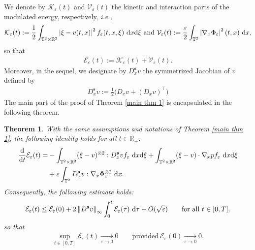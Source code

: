 \documentclass[11pt,reqno]{amsart}
\newtheorem{thm}{Theorem}[section]
\numberwithin{equation}{section}
\def\dd{{\rm d}}
\begin{document}
We denote by $\mathcal{K}_{\varepsilon}(t)$ and $\mathcal{V}_{\varepsilon}(t)$ the kinetic and interaction parts of the modulated energy, respectively, {\it i.e.,} 
\begin{align*}
\mathcal{K}_{\varepsilon}(t):=\frac{1}{2}\int_{\mathbb{T}^{2}\times \mathbb{R}^{2}} \left\vert \xi-v(t,x)\right\vert^{2}f_{\varepsilon}(t,x,\xi)\ \dd x\dd \xi \ \mbox{and}\  \mathcal{V}_{\varepsilon}(t):=\frac{\varepsilon}{2}\int_{\mathbb{T}^{2}} \left\vert \nabla_{x}\Phi_{\varepsilon}\right\vert^{2}(t,x) \ \dd x,   
\end{align*}
so that 
\begin{align}
\mathcal{E}_{\varepsilon}(t):=\mathcal{K}_{\varepsilon}(t)+\mathcal{V}_{\varepsilon}(t). \label{modulated energy}
\end{align}
Moreover, in the sequel, we designate by $D^{\mathbf{s}}_{x}v$ the symmetrized Jacobian of $v$ defined by 
\begin{align*}
D^{\mathbf{s}}_{x}v:= \frac{1}{2}\bigl(D_{x}v+(D_{x}v)^{\top}\bigr)
\end{align*}
The main part of the proof of Theorem \ref{main thm 1} is encapsulated in the following theorem. 
\begin{thm}
With the same assumptions and notations of {\rm Theorem {\rm\ref{main thm 1}}}, the following identity holds for all $t\in \mathbb{R}_{+}${\rm:}
\begin{align}
\frac{\dd}{\dd t}\mathcal{E}_{\varepsilon}(t)=&-\int_{\mathbb{T}^{2}\times \mathbb{R}^{2}} (\xi-v)^{\otimes 2}:D^{\mathbf{s}}_xvf_{\varepsilon}\ \dd x\dd \xi +\int_{\mathbb{T}^{2}\times \mathbb{R}^{2}} (\xi-v)\cdot \nabla_{x} p f_{\varepsilon}\ \dd x\dd \xi \notag
\\
&+\varepsilon\int_{\mathbb{T}^{2}} D^{\mathbf{s}}_{x}v:\nabla_{x} \Phi_{\varepsilon}^{\otimes 2}\ \dd x. 
\label{time derivative of modulated energy}    
\end{align}
Consequently, the following estimate holds{\rm:} 
\begin{align}
\mathcal{E}_{\varepsilon}(t)\leq \mathcal{E}_{\varepsilon}(0)+2\left\Vert D^{\mathbf{s}}v\right\Vert_{\infty} \int_{0}^{t}\mathcal{E}_{\varepsilon}(\tau)\ \dd \tau+O(\sqrt{\varepsilon}) 
\qquad \mbox{for all $t\in [0,T]$},\label{est for modulated energy}      
\end{align}
so that
\begin{align}
 \underset{t\in [0,T]}{\sup}\mathcal{E}_{\varepsilon}(t)\underset{\varepsilon\rightarrow 0}{\longrightarrow}0 
 \qquad \mbox{provided}\ \mathcal{E}_{\varepsilon}(0)\underset{\varepsilon\rightarrow 0}{\longrightarrow }0. \label{asymptotic vanishing mod energy}     
\end{align}
\label{main est thm 1}
\end{thm}
\end{document}
